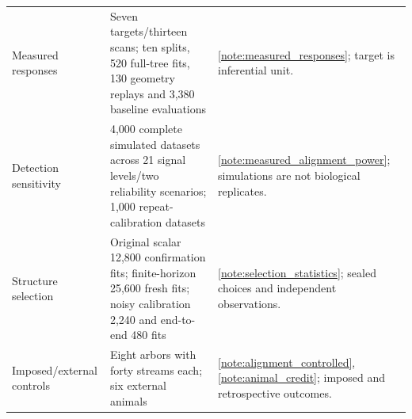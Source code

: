 \begin{longtable}{p{}p{}p{}}
Measured responses & Seven targets/thirteen scans; ten splits, 520 full-tree fits, 130 geometry replays and 3,380 baseline evaluations & \ref{note:measured_responses}; target is inferential unit. \\
Detection sensitivity & 4,000 complete simulated datasets across 21 signal levels/two reliability scenarios; 1,000 repeat-calibration datasets & \ref{note:measured_alignment_power}; simulations are not biological replicates. \\
Structure selection & Original scalar 12,800 confirmation fits; finite-horizon 25,600 fresh fits; noisy calibration 2,240 and end-to-end 480 fits & \ref{note:selection_statistics}; sealed choices and independent observations. \\
Imposed/external controls & Eight arbors with forty streams each; six external animals & \ref{note:alignment_controlled}, \ref{note:animal_credit}; imposed and retrospective outcomes. \\
\bottomrule
\end{longtable}

